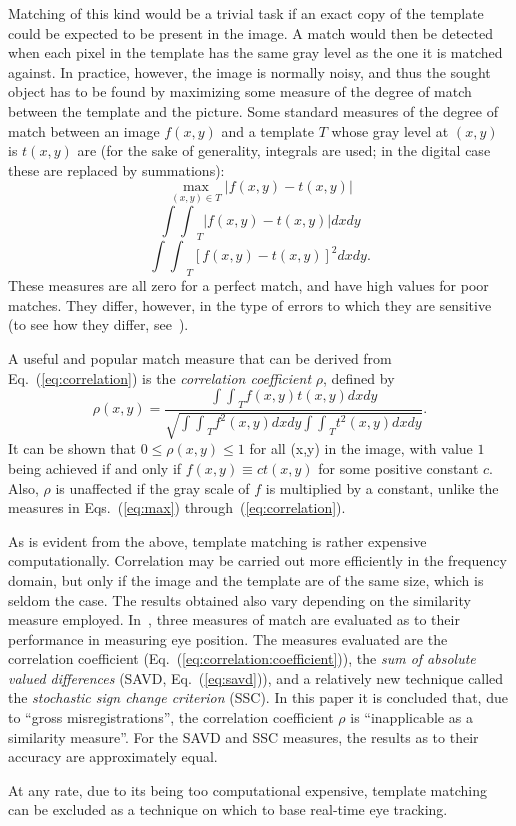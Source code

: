 Matching of this kind would be a trivial task if an exact copy of the
template could be expected to be present in the image.  A match would
then be detected when each pixel in the template has the same gray
level as the one it is matched against.  In practice, however, the
image is normally noisy, and thus the sought object has to be found by
maximizing some measure of the degree of match between the template
and the picture.  Some standard measures of the degree of match
between an image $f(x,y)$ and a template $T$ whose gray level at
$(x,y)$ is $t(x,y)$ are (for the sake of generality, integrals are
used; in the digital case these are replaced by summations):
\begin{equation}
\label{eq:max}
  \max_{(x,y)\in T}|f(x,y)-t(x,y)|
\end{equation}
\begin{equation}
\label{eq:savd}
  {\int\int}_{T}|f(x,y)-t(x,y)|dxdy
\end{equation}
\begin{equation}
\label{eq:correlation}
  {\int\int}_{T}[f(x,y)-t(x,y)]^{2}dxdy\mbox{.}
\end{equation}
These measures are all zero for a perfect match, and have high values
for poor matches.  They differ, however, in the type of errors to
which they are sensitive (to see how they differ, see~\cite{digpat}).

A useful and popular match measure that can be derived from
Eq.~(\ref{eq:correlation}) is the {\em correlation coefficient\/}
$\rho$, defined by
\begin{equation}
\label{eq:correlation:coefficient}
  \rho(x,y)=\frac{{\int\int}_{T}f(x,y)t(x,y)dxdy}
  {\sqrt{{\int\int}_{T}f^{2}(x,y)dxdy{\int\int}_{T}t^{2}(x,y)dxdy}}\mbox{.}
\end{equation}
It can be shown that $0\leq \rho(x,y)\leq 1$ for all (x,y) in the
image, with value $1$ being achieved if and only if $f(x,y)\equiv
ct(x,y)$ for some positive constant $c$.  Also, $\rho$ is unaffected
if the gray scale of $f$ is multiplied by a constant, unlike the
measures in Eqs.~(\ref{eq:max}) through~(\ref{eq:correlation}).

As is evident from the above, template matching is rather expensive
computationally.  Correlation may be carried out more efficiently in
the frequency domain, but only if the image and the template are of
the same size, which is seldom the case.  The results obtained also
vary depending on the similarity measure employed.
In~\cite{template}, three measures of match are evaluated as to their
performance in measuring eye position.  The measures evaluated are the
correlation coefficient (Eq.~(\ref{eq:correlation:coefficient})), the
{\em sum of absolute valued differences\/} (SAVD,
Eq.~(\ref{eq:savd})), and a relatively new technique called the {\em
  stochastic sign change criterion\/} (SSC).  In this paper it is
concluded that, due to ``gross misregistrations'', the correlation
coefficient $\rho$ is ``inapplicable as a similarity measure''.  For
the SAVD and SSC measures, the results as to their accuracy are
approximately equal.

At any rate, due to its being too computational expensive, template
matching can be excluded as a technique on which to base real-time eye
tracking.
